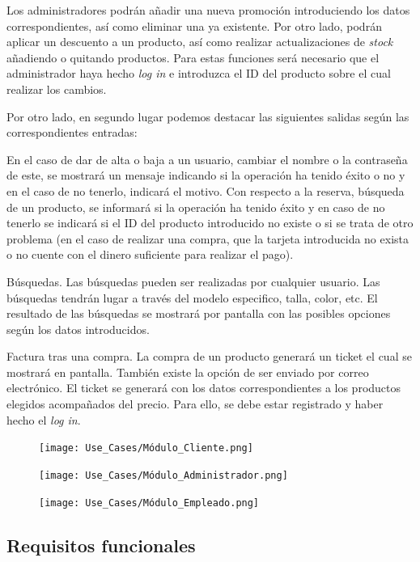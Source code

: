 Los administradores podrán añadir una nueva promoción introduciendo los datos correspondientes, así como eliminar una ya existente. Por otro lado, podrán aplicar un descuento a un producto, así como realizar actualizaciones de \textit{stock} añadiendo o quitando productos. Para estas funciones será necesario que el administrador haya hecho \textit{log in} e introduzca el ID del producto sobre el cual realizar los cambios.

Por otro lado, en segundo lugar podemos destacar las siguientes salidas según las correspondientes entradas:

En el caso de dar de alta o baja a un usuario, cambiar el nombre o la contraseña de este, se mostrará un mensaje indicando si la operación ha tenido éxito o no y en el caso de no tenerlo, indicará el motivo.
Con respecto a la reserva, búsqueda de un producto, se informará si la operación ha tenido éxito y en caso de no tenerlo se indicará si el ID del producto introducido no existe o si se trata de otro problema (en el caso de realizar una compra, que la tarjeta introducida no exista o no cuente con el dinero suficiente para realizar el pago).

Búsquedas. Las búsquedas pueden ser realizadas por cualquier usuario. Las búsquedas tendrán lugar a través del modelo especifico, talla, color, etc. El resultado de las búsquedas se mostrará por pantalla con las posibles opciones según los datos introducidos.

Factura tras una compra. La compra de un producto generará un ticket el cual se mostrará en pantalla. También existe la opción de ser enviado por correo electrónico. El ticket se generará con los datos correspondientes a los productos elegidos acompañados del precio. Para ello, se debe estar registrado y haber hecho el \textit{log in}.

\begin{figure}[H]
    \centering
    \texttt{[image: Use\_Cases/Módulo\_Cliente.png]}
\end{figure}

\begin{figure}[H]
    \centering
    \texttt{[image: Use\_Cases/Módulo\_Administrador.png]}
\end{figure}
\begin{figure}[H]
    \centering
    \texttt{[image: Use\_Cases/Módulo\_Empleado.png]}
\end{figure}

\subsection{Requisitos funcionales}
